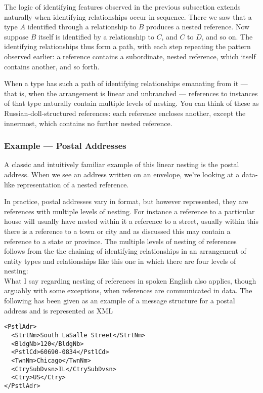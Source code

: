 \begin{worktt}
The logic of identifying features observed in the previous subsection extends naturally when identifying relationships occur in sequence.
There we saw that a type $A$ identified through a relationship to $B$ produces a nested reference.
Now suppose $B$ itself is identified by a relationship to $C$, and $C$ to $D$, and so on.
The identifying relationships thus form a path, with each step repeating the pattern observed earlier: a reference contains a subordinate, nested reference, which itself contains another, and so forth.

When a type has such a path of identifying relationships emanating from it — that is, when the arrangement is linear and unbranched — references to instances of that type naturally contain multiple levels of nesting.
You can think of these as Russian-doll-structured references: each reference encloses another, except the innermost, which contains no further nested reference.
\end{worktt}

\subsubsection{Example --- Postal Addresses}

A classic and intuitively familiar example of this linear nesting is the postal address. 
When we see an address written on an envelope, we’re looking at a data-like representation of a nested reference.

In practice, postal addresses vary in format, but however represented, they are references with multiple levels of nesting.
For instance a reference to a particular house will usually have nested within it a reference to a street, usually within this there is a reference to a town or city and
as discussed this may contain a reference to a state or province.  
The multiple levels of nesting of references follows from the
the chaining of identifying relationships in an arrangement
of entity types and relationships like this one in which there are four levels of nesting:
\begin{equation*}

\end{equation*}
\mynote
What I say regarding nesting of references in spoken English also applies, though arguably with some exceptions, when references are communicated in data.
The following has been given as an example of a message structure for a postal address and is represented as XML
\begin{verbatim}
<PstlAdr>
  <StrtNm>South LaSalle Street</StrtNm>
  <BldgNb>120</BldgNb>
  <PstlCd>60690-0834</PstlCd>
  <TwnNm>Chicago</TwnNm>
  <CtrySubDvsn>IL</CtrySubDvsn>
  <Ctry>US</Ctry>
</PstlAdr>
\end{verbatim}

